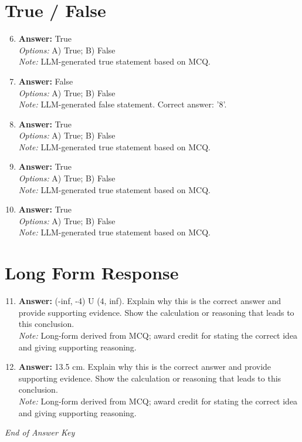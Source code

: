 \documentclass[12pt]{article}
\begin{document}
\section*{True / False}
\begin{enumerate}[label=\arabic*.]
\setcounter{enumi}{5}
\item \textbf{Answer:} True
\\ \textit{Options:} A) True; B) False
\\ \textit{Note:} LLM-generated true statement based on MCQ.
\item \textbf{Answer:} False
\\ \textit{Options:} A) True; B) False
\\ \textit{Note:} LLM-generated false statement. Correct answer: '8'.
\item \textbf{Answer:} True
\\ \textit{Options:} A) True; B) False
\\ \textit{Note:} LLM-generated true statement based on MCQ.
\item \textbf{Answer:} True
\\ \textit{Options:} A) True; B) False
\\ \textit{Note:} LLM-generated true statement based on MCQ.
\item \textbf{Answer:} True
\\ \textit{Options:} A) True; B) False
\\ \textit{Note:} LLM-generated true statement based on MCQ.
\end{enumerate}

\section*{Long Form Response}
\begin{enumerate}[label=\arabic*.]
\setcounter{enumi}{10}
\item \textbf{Answer:} (-inf, -4) U (4, inf). Explain why this is the correct answer and provide supporting evidence. Show the calculation or reasoning that leads to this conclusion.
\\ \textit{Note:} Long-form derived from MCQ; award credit for stating the correct idea and giving supporting reasoning.
\item \textbf{Answer:} 13.5 $\mathrm{cm}$. Explain why this is the correct answer and provide supporting evidence. Show the calculation or reasoning that leads to this conclusion.
\\ \textit{Note:} Long-form derived from MCQ; award credit for stating the correct idea and giving supporting reasoning.
\end{enumerate}

\vfill
\noindent\textit{End of Answer Key}
\end{document}
